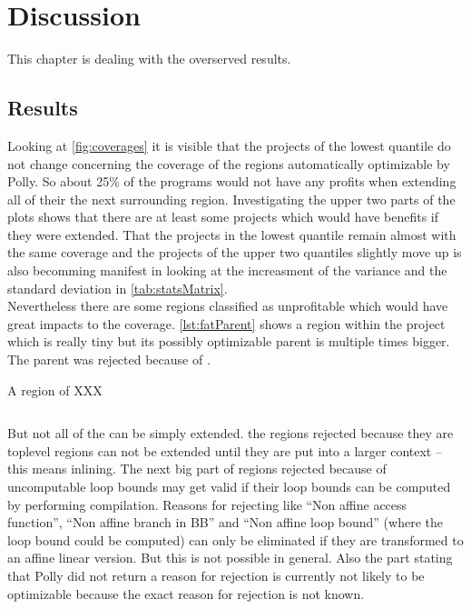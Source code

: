 \chapter{Discussion}
This chapter is dealing with the overserved results.

\section{Results}
Looking at \autoref{fig:coverages} it is visible that the projects of the lowest quantile do not change concerning the coverage of the regions automatically optimizable by Polly.
So about 25\% of the programs would not have any profits when extending all of their \scops the next surrounding region.
Investigating the upper two parts of the plots shows that there are at least some projects which would have benefits if they were extended.
That the projects in the lowest quantile remain almost with the same coverage and the projects of the upper two quantiles slightly move up is also becomming manifest in looking at the increasment of the variance and the standard deviation in \autoref{tab:statsMatrix}.\\
Nevertheless there are some regions classified as unprofitable which would have great impacts to the coverage.
\autoref{lst:fatParent} shows a region within the project  which is really tiny but its possibly optimizable parent is multiple times bigger.
The parent was rejected because of .\\
\begin{code}
    \caption{A region of XXX}
    \inputminted{c++}{cpp/fatParent.cpp}
    \label{lst:fatParent}
\end{code}
But not all of the \scops can be simply extended.
\Eg the regions rejected because they are toplevel regions can not be extended until they are put into a larger context -- this means inlining.
The next big part of regions rejected because of uncomputable loop bounds may get valid if their loop bounds can be computed \eg by performing \jit compilation.
Reasons for rejecting like \enquote{Non affine access function}, \enquote{Non affine branch in BB} and \enquote{Non affine loop bound} (where the loop bound could be computed) can only be eliminated if they are transformed to an affine linear version.
But this is not possible in general. 
Also the part stating that Polly did not return a reason for rejection is currently not likely to be optimizable because the exact reason for rejection is not known.

